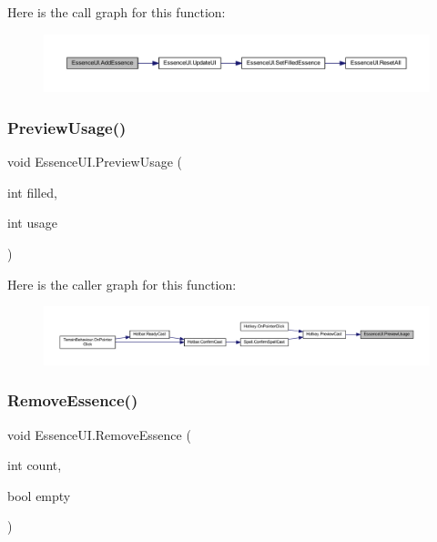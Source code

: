 Here is the call graph for this function\+:\nopagebreak
\begin{figure}[H]
\begin{center}
\leavevmode
\includegraphics[width=350pt]{class_essence_u_i_a1fd3a11e5b47cd87758d337fe1f61384_cgraph}
\end{center}
\end{figure}
\mbox{\label{class_essence_u_i_abe39202e5f4c5134bd6a16ddfd8bb017}} 
\subsubsection{\texorpdfstring{PreviewUsage()}{PreviewUsage()}}
{\footnotesize\ttfamily void Essence\+U\+I.\+Preview\+Usage (\begin{DoxyParamCaption}\item[{int}]{filled,  }\item[{int}]{usage }\end{DoxyParamCaption})}

Here is the caller graph for this function\+:\nopagebreak
\begin{figure}[H]
\begin{center}
\leavevmode
\includegraphics[width=350pt]{class_essence_u_i_abe39202e5f4c5134bd6a16ddfd8bb017_icgraph}
\end{center}
\end{figure}
\mbox{\label{class_essence_u_i_a39b3c1ec97a29130e2e8ab4050921ed6}} 
\subsubsection{\texorpdfstring{RemoveEssence()}{RemoveEssence()}}
{\footnotesize\ttfamily void Essence\+U\+I.\+Remove\+Essence (\begin{DoxyParamCaption}\item[{int}]{count,  }\item[{bool}]{empty }\end{DoxyParamCaption})}

